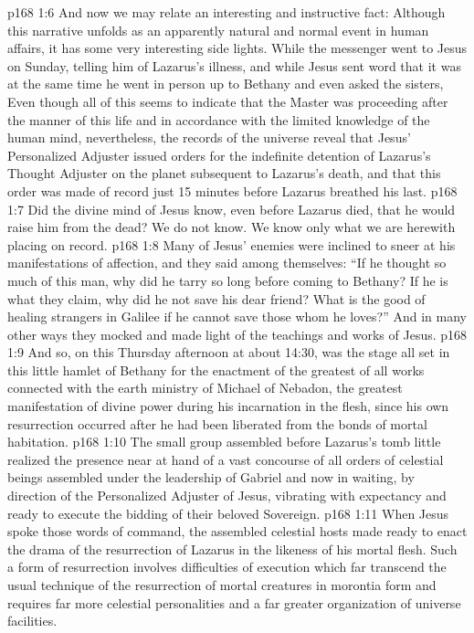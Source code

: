 \vs p168 1:6 \pc And now we may relate an interesting and instructive fact: Although this narrative unfolds as an apparently natural and normal event in human affairs, it has some very interesting side lights. While the messenger went to Jesus on Sunday, telling him of Lazarus’s illness, and while Jesus sent word that it was  at the same time he went in person up to Bethany and even asked the sisters,  Even though all of this seems to indicate that the Master was proceeding after the manner of this life and in accordance with the limited knowledge of the human mind, nevertheless, the records of the universe reveal that Jesus’ Personalized Adjuster issued orders for the indefinite detention of Lazarus’s Thought Adjuster on the planet subsequent to Lazarus’s death, and that this order was made of record just 15 minutes before Lazarus breathed his last.
\vs p168 1:7 Did the divine mind of Jesus know, even before Lazarus died, that he would raise him from the dead? We do not know. We know only what we are herewith placing on record.
\vs p168 1:8 \pc Many of Jesus’ enemies were inclined to sneer at his manifestations of affection, and they said among themselves: “If he thought so much of this man, why did he tarry so long before coming to Bethany? If he is what they claim, why did he not save his dear friend? What is the good of healing strangers in Galilee if he cannot save those whom he loves?” And in many other ways they mocked and made light of the teachings and works of Jesus.
\vs p168 1:9 And so, on this Thursday afternoon at about 14:30, was the stage all set in this little hamlet of Bethany for the enactment of the greatest of all works connected with the earth ministry of Michael of Nebadon, the greatest manifestation of divine power during his incarnation in the flesh, since his own resurrection occurred after he had been liberated from the bonds of mortal habitation.
\vs p168 1:10 The small group assembled before Lazarus’s tomb little realized the presence near at hand of a vast concourse of all orders of celestial beings assembled under the leadership of Gabriel and now in waiting, by direction of the Personalized Adjuster of Jesus, vibrating with expectancy and ready to execute the bidding of their beloved Sovereign.
\vs p168 1:11 When Jesus spoke those words of command,  the assembled celestial hosts made ready to enact the drama of the resurrection of Lazarus in the likeness of his mortal flesh. Such a form of resurrection involves difficulties of execution which far transcend the usual technique of the resurrection of mortal creatures in morontia form and requires far more celestial personalities and a far greater organization of universe facilities.
